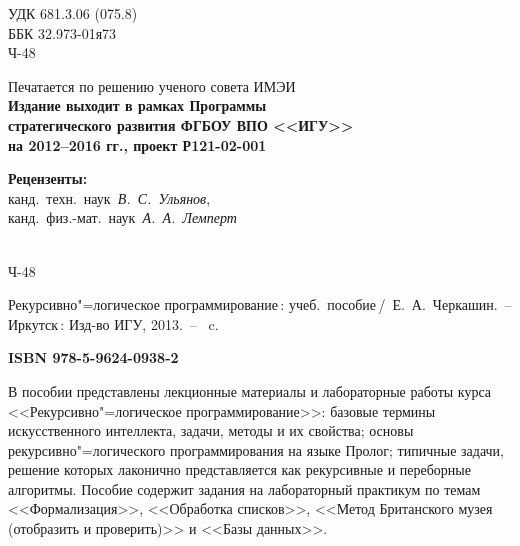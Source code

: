 \documentclass[12pt, openany, twoside, final]{extbook} %
\begin{document}
\newpage
\begin{mygroup}
\thispagestyle{empty}
\noindent УДК 681.3.06 (075.8)\\ %

\noindent ББК 32.973-01я73\\ %

\noindent\mbox{}\hspace{2em}Ч-48 %

\begin{center}\small
Печатается по решению ученого совета ИМЭИ\\[2ex]
\bfseries Издание выходит в рамках Программы\\
стратегического развития ФГБОУ ВПО <<ИГУ>>\\
на 2012--2016 гг., проект Р121-02-001
\end{center}
\vspace{1ex}
\begin{center}\small
\textbf{Рецензенты:} \\
канд.~техн.~наук~{\em В.~С.~Ульянов},\\ канд.~физ.-мат.~наук~{\em А.~А.~Лемперт}
\end{center}
\vfill
\noindent\begin{minipage}[t]{2em}
\noindent\mbox{}\\
Ч-48
\end{minipage}%
\begin{minipage}[t]{0.95\linewidth}
\setlength{\parindent}{5ex}

Рекурсивно"=логическое программирование\,{}: учеб.~пособие\,/~Е.~А.~Черкашин.~--
Иркутск\,: Изд-во ИГУ, 2013.~-- \pageref{lastpage}~c.

{\bfseries ISBN 978-5-9624-0938-2}
\vspace{2ex}

\begingroup\small\parskip0pt
\vspace{1ex}
В пособии представлены лекционные материалы и лабораторные работы курса <<Рекурсивно"=логическое программирование>>: базовые термины искусственного интеллекта, задачи, методы и их свойства; основы рекурсивно"=логического программирования на языке Пролог; типичные задачи, решение которых лаконично представляется как рекурсивные и переборные алгоритмы. Пособие содержит задания на лабораторный практикум по темам <<Формализация>>, <<Обработка списков>>, <<Метод Британского музея (отобразить и проверить)>> и <<Базы данных>>.


\end{minipage}
\end{mygroup}
\end{document}
